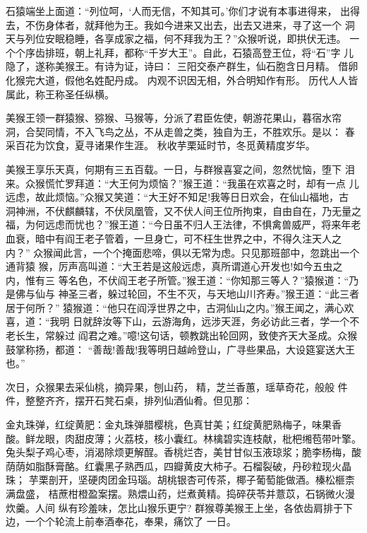 石猿端坐上面道：“列位呵，‘人而无信，不知其可。’你们才说有本事进得来，
出得去，不伤身体者，就拜他为王。我如今进来又出去，出去又进来，寻了这一个
洞天与列位安眠稳睡，各享成家之福，何不拜我为王？”众猴听说，即拱伏无违。
一个个序齿排班，朝上礼拜，都称“千岁大王”。自此，石猿高登王位，将“石”字
儿隐了，遂称美猴王。有诗为证，诗曰：
三阳交泰产群生，仙石胞含日月精。
借卵化猴完大道，假他名姓配丹成。
内观不识因无相，外合明知作有形。
历代人人皆属此，称王称圣任纵横。

美猴王领一群猿猴、猕猴、马猴等，分派了君臣佐使，朝游花果山，暮宿水帘
洞，合契同情，不入飞鸟之丛，不从走兽之类，独自为王，不胜欢乐。是以：
春采百花为饮食，夏寻诸果作生涯。
秋收芋栗延时节，冬觅黄精度岁华。

美猴王享乐天真，何期有三五百载。一日，与群猴喜宴之间，忽然忧恼，堕下
泪来。众猴慌忙罗拜道：“大王何为烦恼？”猴王道：“我虽在欢喜之时，却有一点
儿远虑，故此烦恼。”众猴又笑道：“大王好不知足!我等日日欢会，在仙山福地，古
洞神洲，不伏麒麟辖，不伏凤凰管，又不伏人间王位所拘束，自由自在，乃无量之
福，为何远虑而忧也？”猴王道：“今日虽不归人王法律，不惧禽兽威严，将来年老
血衰，暗中有阎王老子管着，一旦身亡，可不枉生世界之中，不得久注天人之内？”
众猴闻此言，一个个掩面悲啼，俱以无常为虑。只见那班部中，忽跳出一个通背猿
猴，厉声高叫道：“大王若是这般远虑，真所谓道心开发也!如今五虫之内，惟有三
等名色，不伏阎王老子所管。”猴王道：“你知那三等人？”猿猴道：“乃是佛与仙与
神圣三者，躲过轮回，不生不灭，与天地山川齐寿。”猴王道：“此三者居于何所？”
猿猴道：“他只在阎浮世界之中，古洞仙山之内。”猴王闻之，满心欢喜，道：“我明
日就辞汝等下山，云游海角，远涉天涯，务必访此三者，学一个不老长生，常躲过
阎君之难。”噫!这句话，顿教跳出轮回网，致使齐天大圣成。众猴鼓掌称扬，都道：
“善哉!善哉!我等明日越岭登山，广寻些果品，大设筵宴送大王也。”

次日，众猴果去采仙桃，摘异果，刨山药，精，芝兰香蕙，瑶草奇花，般般
件件，整整齐齐，摆开石凳石桌，排列仙酒仙肴。但见那：

金丸珠弹，红绽黄肥：金丸珠弹腊樱桃，色真甘美；红绽黄肥熟梅子，味果香
酸。鲜龙眼，肉甜皮薄；火荔枝，核小囊红。林檎碧实连枝献，枇杷缃苞带叶擎。
兔头梨子鸡心枣，消渴除烦更解酲。香桃烂杏，美甘甘似玉液琼浆；脆李杨梅，酸
荫荫如脂酥膏酪。红囊黑子熟西瓜，四瓣黄皮大柿子。石榴裂破，丹砂粒现火晶珠；
芋栗剖开，坚硬肉团金玛瑙。胡桃银杏可传茶，椰子葡萄能做酒。榛松榧柰满盘盛，
桔蔗柑橙盈案摆。熟煨山药，烂煮黄精。捣碎茯苓并薏苡，石锅微火漫炊羹。人间
纵有珍羞味，怎比山猴乐更宁?
群猴尊美猴王上坐，各依齿肩排于下边，一个个轮流上前奉酒奉花，奉果，痛饮了
一日。

